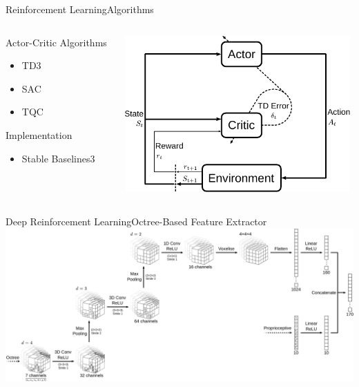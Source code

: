 \begin{frame}{Reinforcement Learning}{Algorithms}
    \begin{columns}%
        \begin{column}{0.3\textwidth}%
            \begin{block}{Actor-Critic Algorithms}
                \begin{itemize}
                    \item TD3
                    \item SAC
                    \item TQC
                \end{itemize}
            \end{block}
            \begin{block}{Implementation}
                \begin{itemize}
                    \item Stable Baselines3
                \end{itemize}
            \end{block}
        \end{column}
        \begin{column}{0.7\textwidth}%
            \centering
            \includegraphics[height=6cm]{graphics/actor_critic_loop.pdf}
        \end{column}
    \end{columns}
\end{frame}

\begin{frame}{Deep Reinforcement Learning}{Octree-Based Feature Extractor}
    \centering
    \includegraphics[width=\textwidth]{graphics/feature_extractor.pdf}
\end{frame}


